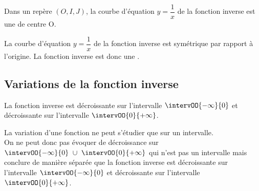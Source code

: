     \begin{brmqs}
        \begin{itemRem}
            \item Dans un repère $(O, I, J)$, la courbe d'équation $y= \dfrac{1}{x}$  de la fonction inverse est une  de centre O.
            \item 	La courbe d'équation $y= \dfrac{1}{x}$ de la fonction inverse est symétrique par rapport à l'origine. La fonction inverse est donc une .
        \end{itemRem}
    \end{brmqs}
    
    \subsection{Variations de la fonction inverse}
    
    \begin{bprop}
        La fonction inverse est décroissante sur l'intervalle $\intervOO{-\infty}{0}$  et décroissante sur l'intervalle $\intervOO{0}{+\infty}$.
    \end{bprop}
    
    \begin{brmq}
        La variation d'une fonction ne peut s'étudier que sur un intervalle. \\
        On ne peut donc pas évoquer de décroissance sur $\intervOO{-\infty}{0}\  \cup \  \intervOO{0}{+\infty}$ qui n'est pas un intervalle mais conclure de manière séparée que la fonction inverse est décroissante sur l'intervalle $\intervOO{-\infty}{0}$ et décroissante sur l'intervalle $\intervOO{0}{+\infty}$.
    \end{brmq}
    
    
